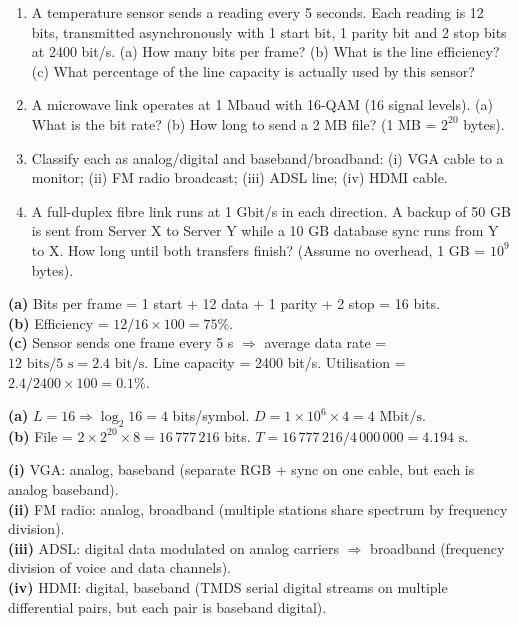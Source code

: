 \documentclass[11pt]{article}
\begin{document}
\begin{exercice}
\begin{enumerate}
\item A temperature sensor sends a reading every 5 seconds. Each reading is 12 bits, transmitted asynchronously with 1 start bit, 1 parity bit and 2 stop bits at 2400 bit/s. (a) How many bits per frame? (b) What is the line efficiency? (c) What percentage of the line capacity is actually used by this sensor?
\item A microwave link operates at 1 Mbaud with 16-QAM (16 signal levels). (a) What is the bit rate? (b) How long to send a 2 MB file? (1 MB = $2^{20}$ bytes).
\item Classify each as analog/digital and baseband/broadband: (i) VGA cable to a monitor; (ii) FM radio broadcast; (iii) ADSL line; (iv) HDMI cable.
\item A full-duplex fibre link runs at 1 Gbit/s in each direction. A backup of 50 GB is sent from Server X to Server Y while a 10 GB database sync runs from Y to X. How long until both transfers finish? (Assume no overhead, 1 GB = $10^9$ bytes).
\end{enumerate}
\end{exercice}

\begin{corrige}[Exercise 1]
\textbf{(a)} Bits per frame = 1 start + 12 data + 1 parity + 2 stop = 16 bits.\\
\textbf{(b)} Efficiency = $12/16 \times 100 = 75\%$.\\
\textbf{(c)} Sensor sends one frame every 5 s $\Rightarrow$ average data rate = $12 \text{ bits} / 5 \text{ s} = 2.4 \text{ bit/s}$. Line capacity = 2400 bit/s. Utilisation = $2.4 / 2400 \times 100 = 0.1\%$.
\end{corrige}

\begin{corrige}[Exercise 2]
\textbf{(a)} $L=16 \Rightarrow \log_2 16 = 4$ bits/symbol. $D = 1 \times 10^6 \times 4 = 4 \text{ Mbit/s}$.\\
\textbf{(b)} File = $2 \times 2^{20} \times 8 = 16\,777\,216$ bits. $T = 16\,777\,216 / 4\,000\,000 = 4.194 \text{ s}$.
\end{corrige}

\begin{corrige}[Exercise 3]
\textbf{(i)} VGA: analog, baseband (separate RGB + sync on one cable, but each is analog baseband).\\
\textbf{(ii)} FM radio: analog, broadband (multiple stations share spectrum by frequency division).\\
\textbf{(iii)} ADSL: digital data modulated on analog carriers $\Rightarrow$ broadband (frequency division of voice and data channels).\\
\textbf{(iv)} HDMI: digital, baseband (TMDS serial digital streams on multiple differential pairs, but each pair is baseband digital).
\end{corrige}
\end{document}
